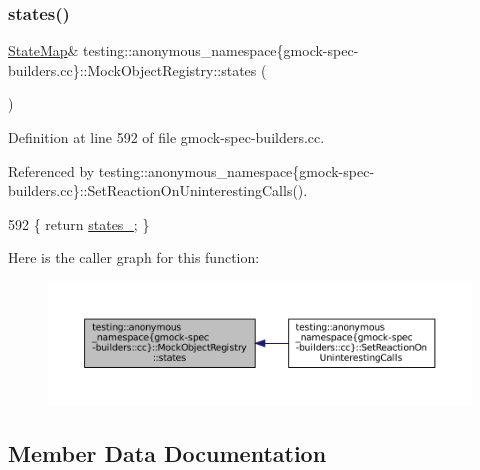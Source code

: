 \subsubsection{\texorpdfstring{states()}{states()}}
{\footnotesize\ttfamily \hyperlink{classtesting_1_1anonymous__namespace_02gmock-spec-builders_8cc_03_1_1MockObjectRegistry_aaa830ac72cc6bc5007f65f7257d97765}{State\+Map}\& testing\+::anonymous\+\_\+namespace\{gmock-\/spec-\/builders.\+cc\}\+::Mock\+Object\+Registry\+::states (\begin{DoxyParamCaption}{ }\end{DoxyParamCaption})\hspace{0.3cm}{\ttfamily [inline]}}



Definition at line 592 of file gmock-\/spec-\/builders.\+cc.



Referenced by testing\+::anonymous\+\_\+namespace\{gmock-\/spec-\/builders.\+cc\}\+::\+Set\+Reaction\+On\+Uninteresting\+Calls().


\begin{DoxyCode}
592 \{ \textcolor{keywordflow}{return} \hyperlink{classtesting_1_1anonymous__namespace_02gmock-spec-builders_8cc_03_1_1MockObjectRegistry_a6edd3b24e40aeef22219a0a423f40c60}{states\_}; \}
\end{DoxyCode}
Here is the caller graph for this function\+:
\nopagebreak
\begin{figure}[H]
\begin{center}
\leavevmode
\includegraphics[width=350pt]{classtesting_1_1anonymous__namespace_02gmock-spec-builders_8cc_03_1_1MockObjectRegistry_a9fcca86257d75633185af67a47c72e9a_icgraph}
\end{center}
\end{figure}


\subsection{Member Data Documentation}
\mbox{\label{classtesting_1_1anonymous__namespace_02gmock-spec-builders_8cc_03_1_1MockObjectRegistry_a6edd3b24e40aeef22219a0a423f40c60}} 
